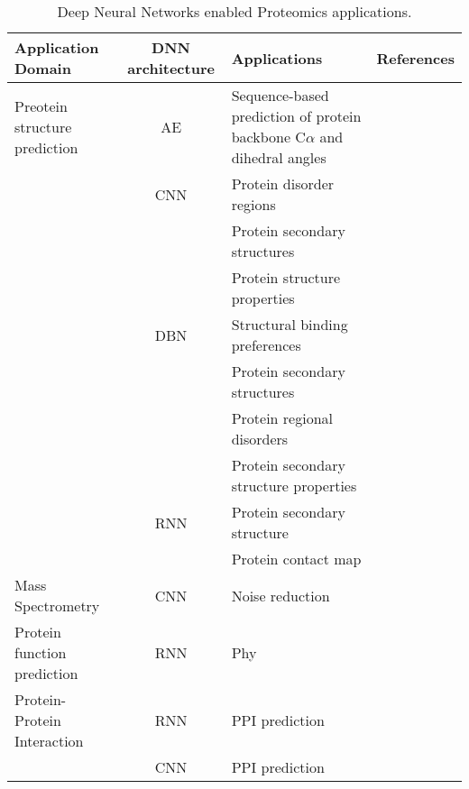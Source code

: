 \begin{table}[h!]
\centering
\begin{tabular}{|| l | c | l | l ||}
    \hline
    Application Domain & DNN architecture & Applications & References\\
    \hline \hline
    Preotein structure prediction & AE & Sequence-based prediction of protein backbone C$\alpha$ and dihedral angles & \\
    & CNN & Protein disorder regions & \\
    &     & Protein secondary structures & \\
    &     & Protein structure properties & \\
    & DBN & Structural binding preferences & \\
    &     & Protein secondary structures & \\
    &     & Protein regional disorders & \\
    &     & Protein secondary structure properties & \\
    & RNN & Protein secondary structure & \\
    &     & Protein contact map & \\
    \hline 
    Mass Spectrometry & CNN & Noise reduction & \\
    \hline 
    Protein function prediction & RNN & Phy \\
    \hline 
    Protein-Protein Interaction & RNN & PPI prediction &  \\
    & CNN & PPI prediction & \\
    \hline \hline
\end{tabular}
\caption{Deep Neural Networks enabled Proteomics applications.}
\label{tab:PS-DNN}
\end{table}